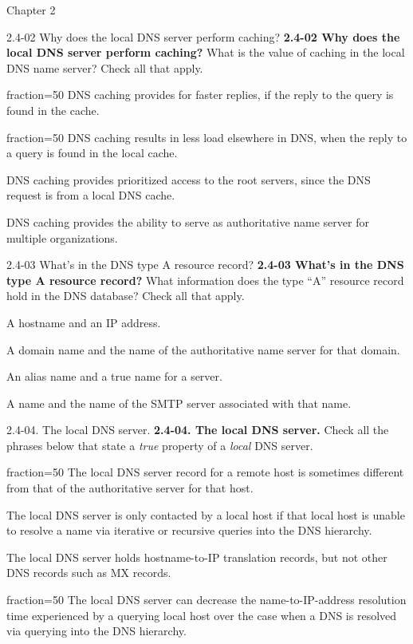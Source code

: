 \documentclass[a4paper]{article}
\begin{document}
\begin{quiz}{Chapter 2}
\begin{multi}[points=1,shuffle,multiple]{2.4-02 Why does the local DNS server perform caching?}
\textbf{2.4-02 Why does the local DNS server perform caching?} 
What is the value of caching in the local DNS name server? Check all that apply.

\item[fraction=50] DNS caching provides for faster replies, if the reply to the query is found in the cache.
\item[fraction=50] DNS caching results in less load elsewhere in DNS, when the reply to a query is found in the local cache.
\item DNS caching provides prioritized access to the root servers, since the DNS request is from a local DNS cache.
\item DNS caching provides the ability to serve as authoritative name server for multiple organizations.
\end{multi}

\begin{multi}[points=1,shuffle,multiple]{2.4-03 What's in the DNS type A resource record?}
\textbf{2.4-03 What's in the DNS type A resource record?} 
What information does the type ``A'' resource record hold in the DNS database? Check all that apply.
\item* A hostname and an IP address.
\item A domain name and the name of the authoritative name server for that domain.
\item An alias name and a true name for a server.
\item A name and the name of the SMTP server associated with that name.
\end{multi}

\begin{multi}[points=1,shuffle,multiple]{2.4-04. The local DNS server.}
\textbf{2.4-04. The local DNS server.} 
Check all the phrases below that state a \emph{true} property of a \emph{local} DNS server.
\item[fraction=50] The local DNS server record for a remote host is sometimes different from that of the authoritative server for that host.
\item The local DNS server is only contacted by a local host if that local host is unable to resolve a name via iterative or recursive queries into the DNS hierarchy.
\item The local DNS server holds hostname-to-IP translation records, but not other DNS records such as MX records.
\item[fraction=50] The local DNS server can decrease the name-to-IP-address resolution time experienced by a querying local host over the case when a DNS is resolved via querying into the DNS hierarchy.
\end{multi}


\end{quiz}
\end{document}
